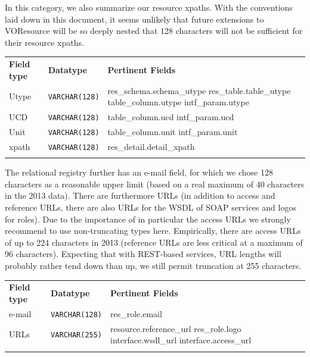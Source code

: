 \documentclass[11pt,a4paper]{ivoa}
\begin{document}
In this category, we also summarize our resource xpaths.  With the
conventions laid down in this document, it seems unlikely that future
extensions to VOResource will be so deeply nested that 128 characters
will not be sufficient for their resource xpaths.

\begin{inlinetable}
\begin{tabular}{llp{6cm}}
\sptablerule
\textbf{Field type}&
\textbf{Datatype}&
\textbf{Pertinent Fields}\\
\sptablerule
Utype&\texttt{VARCHAR(128)}&res\_schema.schema\_utype\hfil\break
res\_table.table\_utype\hfil\break
table\_column.utype\hfil\break
intf\_param.utype\\
\sptablerule
UCD&\texttt{VARCHAR(128)}&
          table\_column.ucd\hfil\break
          intf\_param.ucd\\
\sptablerule
Unit&\texttt{VARCHAR(128)}&
          table\_column.unit\hfil\break
          intf\_param.unit\\
\sptablerule
xpath&\texttt{VARCHAR(128)}&
          res\_detail.detail\_xpath \\
\sptablerule
\end{tabular}
\end{inlinetable}

The relational registry further has an
e-mail field, for which we chose 128 characters as a reasonable upper
limit (based on a real maximum of 40 characters in the 2013 data).
There are furthermore URLs (in addition to access and reference URLs,
there are also URLs for the WSDL of SOAP services and logos for roles).
Due to the importance of in particular the access URLs we strongly
recommend to use non-truncating types here.  Empirically, there are
access URLs of up to 224 characters in 2013 (reference URLs are less
critical at a maximum of 96 characters).  Expecting that with REST-based
services, URL lengths will probably rather tend down than up, we still
permit truncation at 255 characters.


\begin{inlinetable}
\begin{tabular}{llp{6cm}}
\sptablerule
\textbf{Field type}&
\textbf{Datatype}&
\textbf{Pertinent Fields}\\
\sptablerule
e-mail&\texttt{VARCHAR(128)}&
          res\_role.email\\
\sptablerule
URLs&\texttt{VARCHAR(255)}&resource.reference\_url\hfil\break
          res\_role.logo\hfil\break
          interface.wsdl\_url\hfil\break
          interface.access\_url \\
\sptablerule
\end{tabular}
\end{inlinetable}
\end{document}
